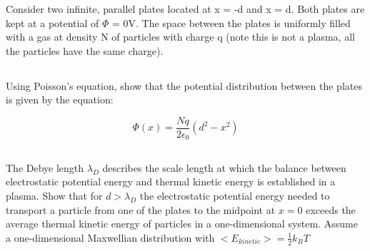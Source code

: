 \documentclass{template}
\begin{document}
Consider two infinite, parallel plates located at x = -d and x = d. Both plates are kept at a potential of $\Phi$ = 0V. The space between the plates is uniformly filled with a gas at density N of particles with charge q (note this is not a plasma, all the particles have the same charge).

\subsection{}

Using Poisson's equation, show that the potential distribution between the plates is given by the equation:

\[
    \Phi(x) = \frac{Nq}{2\epsilon_0}(d^2 - x^2)
\]


\subsection{}

The Debye length $\lambda_D$ describes the scale length at which the balance between electrostatic potential energy and thermal kinetic energy is established in a plasma. Show that for $d > \lambda_D$ the electrostatic potential energy needed to transport a particle from one of the plates to the midpoint at $x=0$ exceeds the average thermal kinetic energy of particles in a one-dimensional system. Assume a one-dimensional Maxwellian distribution with $<E_{kinetic}>=\frac{1}{2}k_B T$



\end{document}
